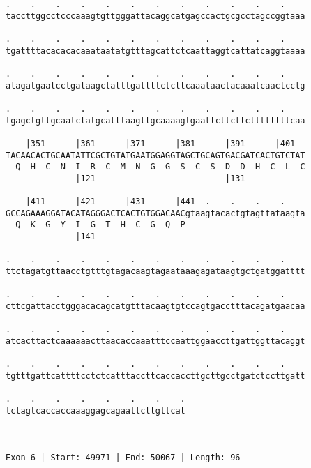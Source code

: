 \documentclass{article}
\begin{document}
\begin{Verbatim}
.    .    .    .    .    .    .    .    .    .    .    .    
taccttggcctcccaaagtgttgggattacaggcatgagccactgcgcctagccggtaaa
                                                            
.    .    .    .    .    .    .    .    .    .    .    .    
tgattttacacacacaaataatatgtttagcattctcaattaggtcattatcaggtaaaa
                                                            
.    .    .    .    .    .    .    .    .    .    .    .    
atagatgaatcctgataagctatttgattttctcttcaaataactacaaatcaactcctg
                                                            
.    .    .    .    .    .    .    .    .    .    .    .    
tgagctgttgcaatctatgcatttaagttgcaaaagtgaattcttcttcttttttttcaa
                                                            
    |351      |361      |371      |381      |391      |401  
TACAACACTGCAATATTCGCTGTATGAATGGAGGTAGCTGCAGTGACGATCACTGTCTAT
  Q  H  C  N  I  R  C  M  N  G  G  S  C  S  D  D  H  C  L  C
              |121                          |131            
  
    |411      |421      |431      |441  .    .    .    .    
GCCAGAAAGGATACATAGGGACTCACTGTGGACAACgtaagtacactgtagttataagta
  Q  K  G  Y  I  G  T  H  C  G  Q  P                        
              |141                                          
  
.    .    .    .    .    .    .    .    .    .    .    .    
ttctagatgttaacctgtttgtagacaagtagaataaagagataagtgctgatggatttt
                                                            
.    .    .    .    .    .    .    .    .    .    .    .    
cttcgattacctgggacacagcatgtttacaagtgtccagtgacctttacagatgaacaa
                                                            
.    .    .    .    .    .    .    .    .    .    .    .    
atcacttactcaaaaaacttaacaccaaatttccaattggaaccttgattggttacaggt
                                                            
.    .    .    .    .    .    .    .    .    .    .    .    
tgtttgattcattttcctctcatttaccttcaccaccttgcttgcctgatctccttgatt
                                                            
.    .    .    .    .    .    .    .
tctagtcaccaccaaaggagcagaattcttgttcat
                                    
                                    
 
Exon 6 | Start: 49971 | End: 50067 | Length: 96
 

\end{Verbatim}
\end{document}
